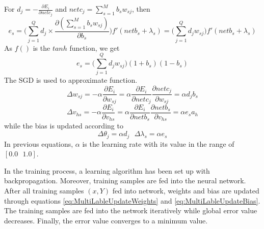 For $d_{j} = - \frac{\partial E_{i}}{\partial netc_{j}}$ and $netc_{j} = \sum_{s=1}^M b_{s}w_{sj}$, then 
\begin{equation}\label{eq:MultiLableGenErrEs}
e_{s} = \big( \sum_{j=1}^Q d_{j} \times \frac{\partial (\sum_{s=1}^M b_{s}w_{sj})}{\partial b_{s}}\big) f'(netb_{s} + \lambda_{s}) = \big( \sum_{j=1}^Q d_{j}w_{sj}\big) f'(netb_{s} + \lambda_{s})
\end{equation}
As $f()$ is the $tanh$ function, we get
\begin{equation}\label{eq:MultiLableGenErrEsFin}
e_{s} = \big( \sum_{j=1}^Q d_{j}w_{sj}\big) (1+b_{s})(1-b_{s})
\end{equation}
The SGD is used to approximate function.
\begin{equation}\label{eq:MultiLableUpdateWeights}
\Delta w_{sj} = -\alpha \frac{\partial E_{i}}{\partial w_{sj}} = \alpha \frac{\partial E_{i}}{\partial netc_{j}} \frac{\partial netc_{j}}{\partial w_{sj}} = \alpha d_{j}b_{s}
\end{equation}
\begin{equation}\label{eq:MultiLableUpdateHidWeights}
\Delta v_{hs} = -\alpha \frac{\partial E_{i}}{\partial v_{hs}} = \alpha \frac{\partial E_{i}}{\partial netb_{s}} \frac{\partial netb_{s}}{\partial v_{hs}} = \alpha e_{s}a_{h}
\end{equation}
while the bias is updated according to
\begin{equation}\label{eq:MultiLableUpdateBias}
\Delta \theta_{j} = \alpha d_{j} \text{ } \Delta \lambda_{s} = \alpha e_{s}
\end{equation}
In previous equations, $\alpha$ is the learning rate with its value in the range of $[0.0 \text{ } 1.0]$.

In the training process, a learning algorithm has been set up with backpropagation. Moreover, training samples are fed into the neural network. After all training samples $(x, Y)$ fed into network, weights and bias are updated through equations \ref{eq:MultiLableUpdateWeights} and \ref{eq:MultiLableUpdateBias}. The training samples are fed into the network iteratively while global error value decreases. Finally, the error value converges to a minimum value.

